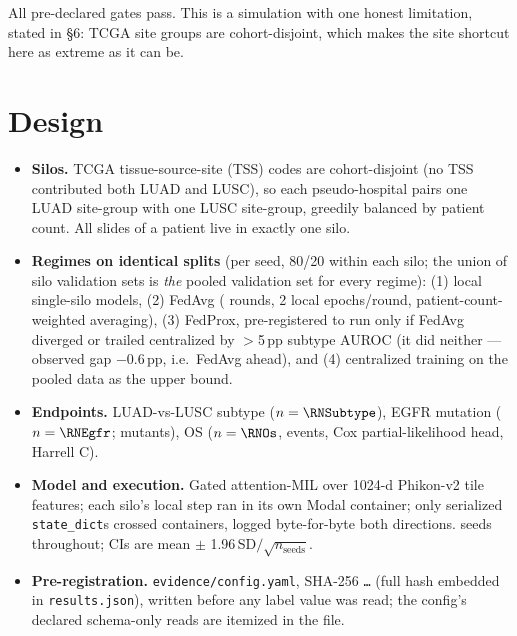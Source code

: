\documentclass[11pt,a4paper]{article}
\begin{document}
All \RNGates{} pre-declared gates pass. This is a simulation with one honest limitation, stated
in \S6: TCGA site groups are cohort-disjoint, which makes the site shortcut here as extreme as
it can be.

\section{Design}

\begin{itemize}[leftmargin=1.2em,itemsep=2pt]
\item \textbf{Silos.} TCGA tissue-source-site (TSS) codes are cohort-disjoint (no TSS contributed
both LUAD and LUSC), so each pseudo-hospital pairs one LUAD site-group with one LUSC site-group,
greedily balanced by patient count. All slides of a patient live in exactly one silo.
\item \textbf{Regimes on identical splits} (per seed, 80/20 within each silo; the union of silo
validation sets is \emph{the} pooled validation set for every regime): (1) local single-silo
models, (2) FedAvg (\RRounds{} rounds, 2 local epochs/round, patient-count-weighted averaging),
(3) FedProx, pre-registered to run only if FedAvg diverged or trailed centralized by
$>$5\,pp subtype AUROC (it did neither --- observed gap $-$0.6\,pp, i.e.\ FedAvg ahead), and
(4) centralized training on the pooled data as the upper bound.
\item \textbf{Endpoints.} LUAD-vs-LUSC subtype ($n=\RNSubtype$), EGFR mutation
($n=\RNEgfr$; \REgfrMutants{} mutants), OS ($n=\RNOs$, \RNOsEvents{} events, Cox
partial-likelihood head, Harrell C).
\item \textbf{Model and execution.} Gated attention-MIL over 1024-d Phikon-v2 tile features;
each silo's local step ran in its own Modal container; only serialized \texttt{state\_dict}s
crossed containers, logged byte-for-byte both directions. \RNSeeds{} seeds throughout; CIs are
mean $\pm$ 1.96\,SD$/\sqrt{n_\text{seeds}}$.
\item \textbf{Pre-registration.} \texttt{evidence/config.yaml}, SHA-256
\texttt{\RConfigShaShort\ldots} (full hash embedded in \texttt{results.json}), written before
any label value was read; the config's declared schema-only reads are itemized in the file.
\end{itemize}

\begin{center}

\end{center}
\end{document}
